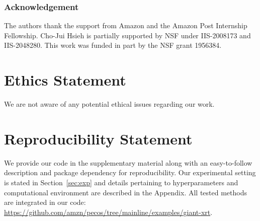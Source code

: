 \documentclass{article} %
\begin{document}

\subsubsection*{Acknowledgement}
The authors thank the support from Amazon and the Amazon Post Internship Fellowship. Cho-Jui Hsieh is partially supported by NSF under IIS-2008173 and IIS-2048280. This work was funded in part by the NSF grant 1956384.

\section{Ethics Statement}
We are not aware of any potential ethical issues regarding our work.
\section{Reproducibility Statement}
We provide our code in the supplementary material along with an easy-to-follow description and package dependency for reproducibility. Our experimental setting is stated in Section~\ref{sec:exp} and details pertaining to hyperparameters and computational environment are described in the Appendix. All tested methods are integrated in our code:
\url{https://github.com/amzn/pecos/tree/mainline/examples/giant-xrt}.
\end{document}
